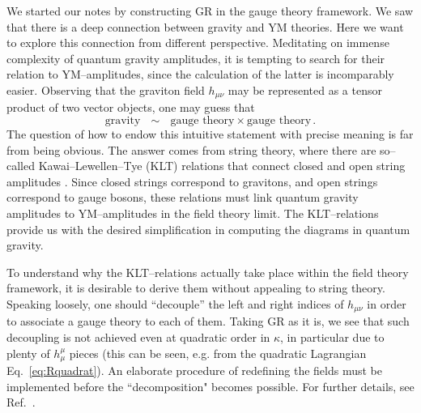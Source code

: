 \documentclass[12pt]{article}
\newcommand{\be}{\begin{equation}}
\newcommand{\ee}{\end{equation}}
\begin{document}
We started our notes by constructing GR in the gauge theory framework. We saw that there is a deep connection between gravity and YM theories. Here we want to explore this connection from different perspective. Meditating on immense complexity of quantum gravity amplitudes, it is tempting to search for their relation to YM--amplitudes, since the calculation of the latter is incomparably easier. Observing that the graviton field $h_{\mu\nu}$ may be represented as a tensor product of two vector objects, one may guess that
\be
\text{gravity}~~~\sim~~~\text{gauge theory}\times\text{gauge theory}\,.
\ee
The question of how to endow this intuitive statement with precise meaning is far from being obvious. The answer comes from string theory, where there are so--called Kawai--Lewellen--Tye (KLT) relations that connect closed and open string amplitudes \cite{Kawai:1985xq}. Since closed strings correspond to gravitons, and open strings correspond to gauge bosons, these relations must link quantum gravity amplitudes to YM--amplitudes in the field theory limit. The KLT--relations provide us with the desired simplification in computing the diagrams in quantum gravity.

To understand why the KLT--relations actually take place within the field theory framework, it is desirable to derive them without appealing to string theory. Speaking loosely, one should ``decouple'' the left and right indices of $h_{\mu\nu}$ in order to associate a gauge theory to each of them. Taking GR as it is, we see that such decoupling is not achieved even at quadratic order in $\kappa$, in particular due to plenty of $h^\mu_\mu$ pieces (this can be seen, e.g. from the quadratic
Lagrangian Eq.~\ref{eq:Rquadrat}). An elaborate procedure of redefining the fields must be implemented before
the ``decomposition" becomes possible. For further details, see Ref.~\cite{Bern:2002kj}.
\end{document}
